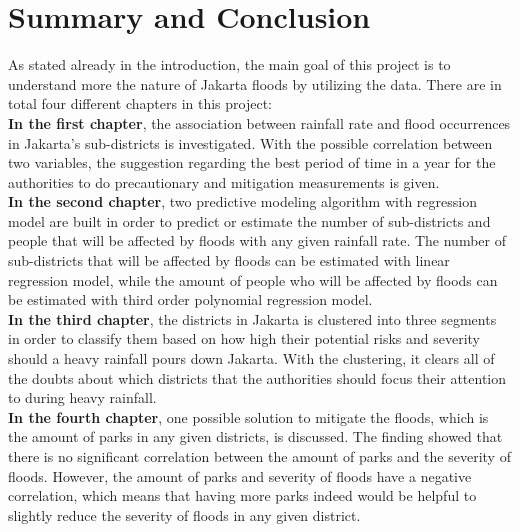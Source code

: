 \chapter{Summary and Conclusion}

As stated already in the introduction, the main goal of this project is to understand more the nature of Jakarta floods by utilizing the data. There are in total four different chapters in this project:\\ 

\noindent
\textbf{In the first chapter}, the association between rainfall rate and flood occurrences in Jakarta's sub-districts is investigated. With the possible correlation between two variables, the suggestion regarding the best period of time in a year for the authorities to do precautionary and mitigation measurements is given.\\

\noindent
\textbf{In the second chapter}, two predictive modeling algorithm with regression model are built in order to predict or estimate the number of sub-districts and people that will be affected by floods with any given rainfall rate. The number of sub-districts that will be affected by floods can be estimated with linear regression model, while the amount of people who will be affected by floods can be estimated with third order polynomial regression model.\\

\noindent
\textbf{In the third chapter}, the districts in Jakarta is clustered into three segments in order to classify them based on how high their potential risks and severity should a heavy rainfall pours down Jakarta. With the clustering, it clears all of the doubts about which districts that the authorities should focus their attention to during heavy rainfall.\\ 

\noindent
\textbf{In the fourth chapter}, one possible solution to mitigate the floods, which is the amount of parks in any given districts, is discussed. The finding showed that there is no significant correlation between the amount of parks and the severity of floods. However, the amount of parks and severity of floods have a negative correlation, which means that having more parks indeed would be helpful to slightly reduce the severity of floods in any given district.